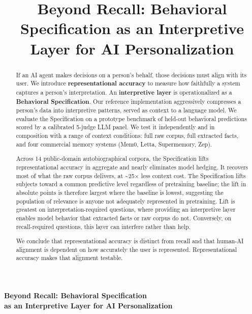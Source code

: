 \documentclass[11pt]{article}
\title{Beyond Recall: Behavioral Specification as an Interpretive Layer for AI Personalization}
\begin{document}
\thispagestyle{empty}

\begin{center}
  {\LARGE\bfseries\color{titleblue} Beyond Recall: Behavioral Specification\\[2pt]
  as an Interpretive Layer for AI Personalization\par}
\end{center}

\vspace{1.2em}

\begin{abstract}
\normalsize
\noindent If an AI agent makes decisions on a person's behalf, those decisions must align with its user. We introduce \textbf{representational accuracy} to measure how faithfully a system captures a person's interpretation. An \textbf{interpretive layer} is operationalized as a \textbf{Behavioral Specification}. Our reference implementation aggressively compresses a person's data into interpretive patterns, served as context to a language model. We evaluate the Specification on a prototype benchmark of held-out behavioral predictions scored by a calibrated 5-judge LLM panel. We test it independently and in composition with a range of context conditions: full raw corpus, full extracted facts, and four commercial memory systems (Mem0, Letta, Supermemory, Zep).

\medskip
\noindent Across 14 public-domain autobiographical corpora, the Specification lifts representational accuracy in aggregate and nearly eliminates model hedging. It recovers most of what the raw corpus delivers, at \textasciitilde25$\times$ less context cost. The Specification lifts subjects toward a common predictive level regardless of pretraining baseline; the lift in absolute points is therefore largest where the baseline is lowest, suggesting the population of relevance is anyone not adequately represented in pretraining. Lift is greatest on interpretation-required questions, where providing an interpretive layer enables model behavior that extracted facts or raw corpus do not. Conversely, on recall-required questions, this layer can interfere rather than help.

\medskip
\noindent We conclude that representational accuracy is distinct from recall and that human-AI alignment is dependent on how accurately the user is represented. Representational accuracy makes that alignment testable.
\end{abstract}
\end{document}
